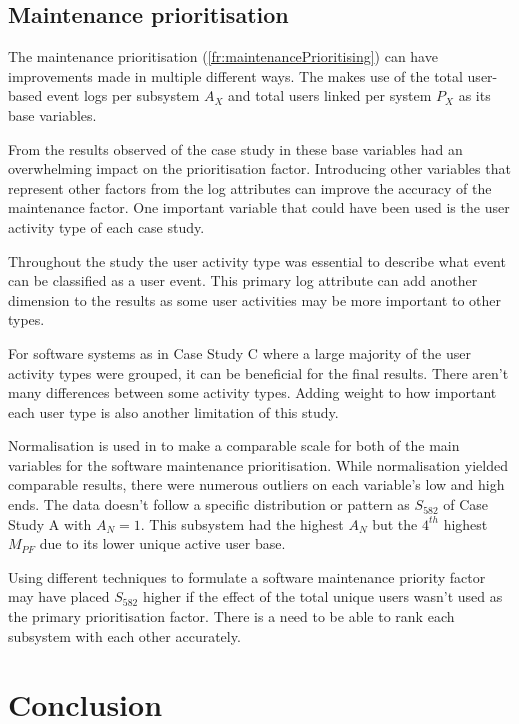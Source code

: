 \subsection{Maintenance prioritisation}
The maintenance prioritisation (\ref{fr:maintenancePrioritising}) can have improvements made in
multiple different ways. The
 makes use
of the total user-based event logs per subsystem $A_X$ and total users linked per system $P_X$ as
its base variables.\par From the results observed of the case study in 
these base variables had an overwhelming impact on the prioritisation factor. Introducing other
variables that represent other factors from the log attributes can improve the accuracy of the
maintenance factor. One important variable that could have been used is the user activity type of
each case study.\par Throughout the study the user activity type was essential to describe what
event can be classified as a user event. This primary log attribute can add another dimension to the
results as some user activities may be more important to other types. \par For software systems as
in Case Study C where a large majority of the user activity types were grouped, it can be beneficial
for the final results. There aren't many differences between some activity types. Adding weight to
how important each user type is also another limitation of this study.\par Normalisation is used in
 to make a
comparable scale for both of the main variables for the software maintenance prioritisation. While
normalisation yielded comparable results, there were numerous outliers on each variable's low and
high ends. The data doesn't follow a specific distribution or pattern as $S_{582}$ of Case Study A
with $A_N=1$. This subsystem had the highest $A_N$ but the $4^{th}$ highest $M_{PF}$ due to
its lower unique active user base.\par Using different techniques to formulate a software
maintenance priority factor may have placed $S_{582}$ higher if the effect of the total unique users
wasn't used as the primary prioritisation factor. There is a need to be able to rank each subsystem
with each other accurately.

\section{Conclusion}

